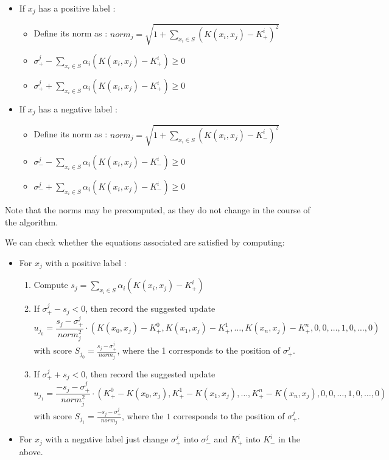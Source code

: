 \documentclass[a4paper,twoside,10pt]{report}
\begin{document}
	\begin{itemize}
		\item If \(x_j\) has a positive label : 
			\begin{itemize}
				\item Define its norm as : \(norm_j = \sqrt{1 + \sum_{x_i\in S} {(K(x_i, x_j) - K^i_+)^2}}\)
				\item \(\sigma^j_+ - \sum_{x_i\in S} {\alpha_i (K(x_i, x_j) - K^i_+)} \geq 0\)
				\item \(\sigma^j_+ + \sum_{x_i\in S} {\alpha_i (K(x_i, x_j) - K^i_+)} \geq 0\)
			\end{itemize}
			
		\item If \(x_j\) has a negative label : 
			\begin{itemize}
				\item Define its norm as : \(norm_j = \sqrt{1 + \sum_{x_i\in S} {(K(x_i, x_j) - K^i_-)^2}}\)
				\item \(\sigma^j_- - \sum_{x_i\in S} {\alpha_i (K(x_i, x_j) - K^i_-)} \geq 0\)
				\item \(\sigma^j_- + \sum_{x_i\in S} {\alpha_i (K(x_i, x_j) - K^i_-)} \geq 0\)
			\end{itemize}			
	\end{itemize}
	
	Note that the norms may be precomputed, as they do not change in the course of the algorithm.
	
	
	We can check whether the equations associated are satisfied by computing:
	
	\begin{itemize}
		\item For \(x_j\) with a positive label : 
			\begin{enumerate}
				\item Compute \(s_j = \sum_{x_i\in S} {\alpha_i (K(x_i, x_j) - K^i_+)}\)
				\item If \(\sigma^j_+ - s_j < 0\), then record the suggested update 
							\[u_{j_0} = \frac{s_j - \sigma^j_+}{norm_j^2} \cdot (K(x_0, x_j) - K^0_+, K(x_1, x_j) - K^1_+, \ldots, K(x_n, x_j) - K^n_+, 0, 0, \ldots, 1, 0, \ldots, 0)\]							
							with score \(S_{j_0} = \frac{s_j - \sigma^j_+}{norm_j}\), where the 1 corresponds to the position of \(\sigma^j_+\).
							
				\item If \(\sigma^j_+ + s_j < 0\), then record the suggested update 
							\[u_{j_1} = \frac{- s_j - \sigma^j_+}{norm_j^2} \cdot (K^0_+ - K(x_0, x_j), K^1_+ - K(x_1, x_j), \ldots, K^n_+ - K(x_n, x_j), 0, 0, \ldots, 1, 0, \ldots, 0)\]
							with score \(S_{j_1} = \frac{- s_j - \sigma^j_+}{norm_j}\), where the \(1\) corresponds to the position of \(\sigma^j_+\).
			\end{enumerate}
			
		\item For \(x_j\) with a negative label just change \(\sigma^j_+\) into \(\sigma^j_-\) and \(K^i_+\) into \(K^i_-\) in the above.
	\end{itemize}
	
\end{document}
